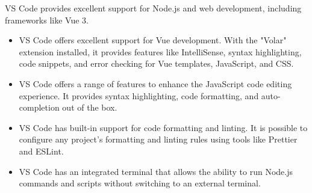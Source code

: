 \ac{VS Code} provides excellent support for Node.js and web development, including frameworks like Vue 3. 
\begin{itemize}
  \item \ac{VS Code} offers excellent support for Vue development. With the "Volar" extension installed, it provides features like IntelliSense, syntax highlighting, code snippets, and error checking for Vue templates, JavaScript, and CSS.
  \item \ac{VS Code} offers a range of features to enhance the JavaScript code editing experience. It provides syntax highlighting, code formatting, and auto-completion out of the box.
  \item \ac{VS Code} has built-in support for code formatting and linting. It is possible to configure any project's formatting and linting rules using tools like Prettier and ESLint.
  \item \ac{VS Code} has an integrated terminal that allows the ability to run Node.js commands and scripts without switching to an external terminal.
\end{itemize}
